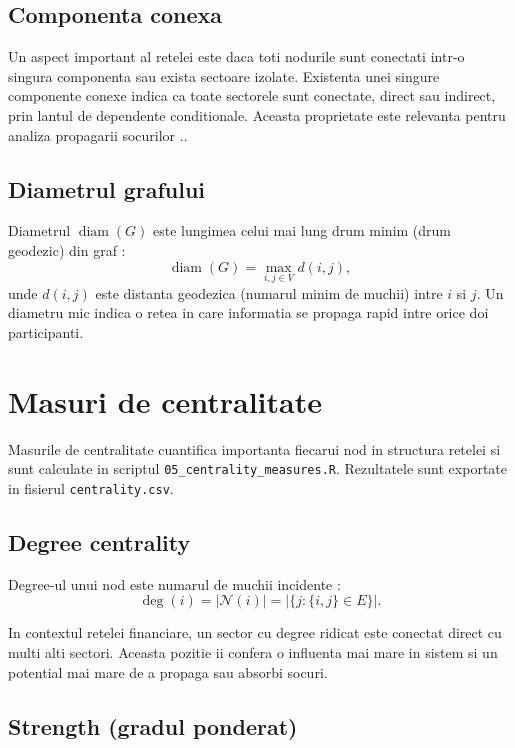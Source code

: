\subsection{Componenta conexa}

Un aspect important al retelei este daca toti nodurile sunt conectati intr-o
singura componenta sau exista sectoare izolate. Existenta unei singure componente
conexe indica ca toate sectorele sunt conectate, direct sau indirect, prin lantul
de dependente conditionale. Aceasta proprietate este relevanta pentru analiza
propagarii socurilor \citep{newman2010}..

\subsection{Diametrul grafului}

Diametrul $\operatorname{diam}(G)$ este lungimea celui mai lung drum minim
(drum geodezic) din graf \citep{newman2010}:
\[
    \operatorname{diam}(G) = \max_{i,j \in V} d(i,j),
\]
unde $d(i,j)$ este distanta geodezica (numarul minim de muchii) intre $i$ si $j$.
Un diametru mic indica o retea in care informatia se propaga rapid intre orice
doi participanti.

\section{Masuri de centralitate}

Masurile de centralitate cuantifica importanta fiecarui nod in structura retelei
si sunt calculate in scriptul \texttt{05\_centrality\_measures.R}. Rezultatele
sunt exportate in fisierul \texttt{centrality.csv}.

\subsection{Degree centrality}

Degree-ul unui nod este numarul de muchii incidente \citep{newman2010}:
\begin{equation}
    \deg(i) = |\mathcal{N}(i)| = |\{j : \{i,j\} \in E\}|.
    \label{eq:degree}
\end{equation}

In contextul retelei financiare, un sector cu degree ridicat este conectat
direct cu multi alti sectori. Aceasta pozitie ii confera o influenta mai mare
in sistem si un potential mai mare de a propaga sau absorbi socuri.

\subsection{Strength (gradul ponderat)}

